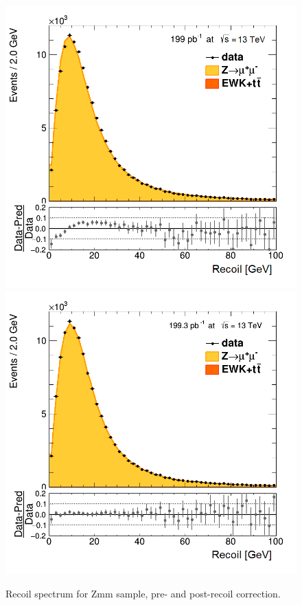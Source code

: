 \begin{figure}
\centering
\includegraphics[width=0.49\linewidth]{plots/Recoil/close_nocorr_13/fitrecoilp.png}
\includegraphics[width=0.49\linewidth]{plots/Recoil/close_corr_13/fitrecoilp.png}
\caption{Recoil spectrum for Zmm sample, pre- and post-recoil correction.}
\label{fig:recoil:validation:recoil}
\end{figure}